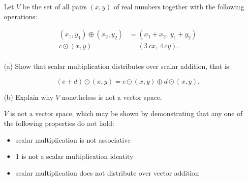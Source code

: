 
\begin{exerciseStatement}


 Let \(V\) be the set of all pairs \((x,y)\) of real numbers together with the following operations: 


\begin{align*} (x_1,y_1)\oplus (x_2,y_2)&= \left(x_{1} + x_{2},\,y_{1} + y_{2}\right)  \\c \odot (x,y) &= \left(3 \, c x,\,4 \, c y\right) . \\ \end{align*}
            

 (a) Show that scalar multiplication distributes over scalar addition, that is: 

\[(c+d)\odot(x,y)=c\odot(x,y)\oplus d\odot (x,y).
    \]

 (b) Explain why \(V\) nonetheless is not a vector space. 


\end{exerciseStatement}
    
\begin{exerciseAnswer} 


\(V\) is not a vector space, which may be shown by demonstrating that any one of the following properties do not hold: 


\begin{itemize}
\item scalar multiplication is not associative
\item 1 is not a scalar multiplication identity
\item scalar multiplication does not distribute over vector addition
\end{itemize}
    
\end{exerciseAnswer}
    
